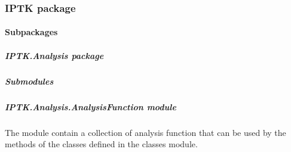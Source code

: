 \documentclass[letterpaper,10pt,english]{sphinxmanual}
\begin{document}
\subsubsection{IPTK package}
\label{\detokenize{IPTK:iptk-package}}\label{\detokenize{IPTK::doc}}

\paragraph{Subpackages}
\label{\detokenize{IPTK:subpackages}}

\subparagraph{IPTK.Analysis package}
\label{\detokenize{IPTK.Analysis:iptk-analysis-package}}\label{\detokenize{IPTK.Analysis::doc}}

\subparagraph{Submodules}
\label{\detokenize{IPTK.Analysis:submodules}}

\subparagraph{IPTK.Analysis.AnalysisFunction module}
\label{\detokenize{IPTK.Analysis:module-IPTK.Analysis.AnalysisFunction}}\label{\detokenize{IPTK.Analysis:iptk-analysis-analysisfunction-module}}
The module contain a collection of analysis function that can be used by the methods of
the classes defined in the classes module.
\end{document}
